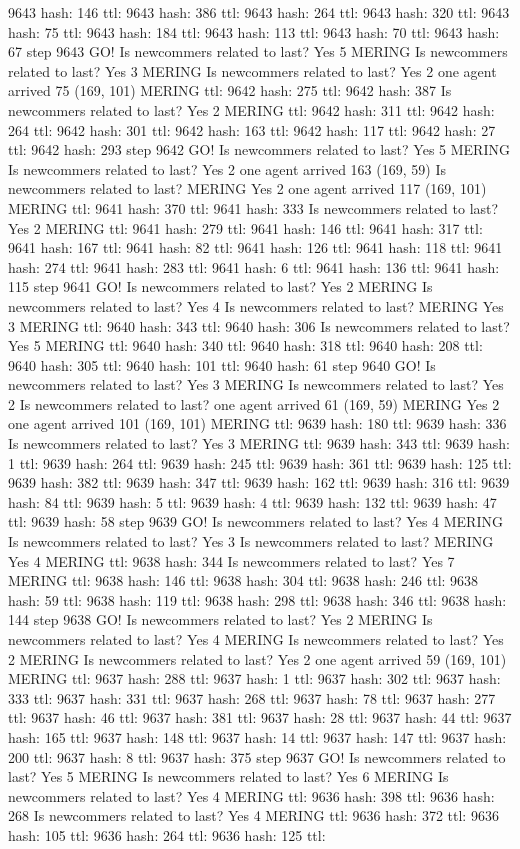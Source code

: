 9643 hash: 146 ttl: 9643 hash: 386 ttl: 9643 hash: 264 ttl: 9643 hash: 320 ttl: 9643 hash: 75 ttl: 9643 hash: 184 ttl: 9643 hash: 113 ttl: 9643 hash: 70 ttl: 9643 hash: 67 step 9643 GO! Is newcommers related to last? Yes 5 MERING Is newcommers related to last? Yes 3 MERING Is newcommers related to last? Yes 2 one agent arrived 75 (169, 101) MERING ttl: 9642 hash: 275 ttl: 9642 hash: 387 Is newcommers related to last? Yes 2 MERING ttl: 9642 hash: 311 ttl: 9642 hash: 264 ttl: 9642 hash: 301 ttl: 9642 hash: 163 ttl: 9642 hash: 117 ttl: 9642 hash: 27 ttl: 9642 hash: 293 step 9642 GO! Is newcommers related to last? Yes 5 MERING Is newcommers related to last? Yes 2 one agent arrived 163 (169, 59) Is newcommers related to last? MERING Yes 2 one agent arrived 117 (169, 101) MERING ttl: 9641 hash: 370 ttl: 9641 hash: 333 Is newcommers related to last? Yes 2 MERING ttl: 9641 hash: 279 ttl: 9641 hash: 146 ttl: 9641 hash: 317 ttl: 9641 hash: 167 ttl: 9641 hash: 82 ttl: 9641 hash: 126 ttl: 9641 hash: 118 ttl: 9641 hash: 274 ttl: 9641 hash: 283 ttl: 9641 hash: 6 ttl: 9641 hash: 136 ttl: 9641 hash: 115 step 9641 GO! Is newcommers related to last? Yes 2 MERING Is newcommers related to last? Yes 4 Is newcommers related to last? MERING Yes 3 MERING ttl: 9640 hash: 343 ttl: 9640 hash: 306 Is newcommers related to last? Yes 5 MERING ttl: 9640 hash: 340 ttl: 9640 hash: 318 ttl: 9640 hash: 208 ttl: 9640 hash: 305 ttl: 9640 hash: 101 ttl: 9640 hash: 61 step 9640 GO! Is newcommers related to last? Yes 3 MERING Is newcommers related to last? Yes 2 Is newcommers related to last? one agent arrived 61 (169, 59) MERING Yes 2 one agent arrived 101 (169, 101) MERING ttl: 9639 hash: 180 ttl: 9639 hash: 336 Is newcommers related to last? Yes 3 MERING ttl: 9639 hash: 343 ttl: 9639 hash: 1 ttl: 9639 hash: 264 ttl: 9639 hash: 245 ttl: 9639 hash: 361 ttl: 9639 hash: 125 ttl: 9639 hash: 382 ttl: 9639 hash: 347 ttl: 9639 hash: 162 ttl: 9639 hash: 316 ttl: 9639 hash: 84 ttl: 9639 hash: 5 ttl: 9639 hash: 4 ttl: 9639 hash: 132 ttl: 9639 hash: 47 ttl: 9639 hash: 58 step 9639 GO! Is newcommers related to last? Yes 4 MERING Is newcommers related to last? Yes 3 Is newcommers related to last? MERING Yes 4 MERING ttl: 9638 hash: 344 Is newcommers related to last? Yes 7 MERING ttl: 9638 hash: 146 ttl: 9638 hash: 304 ttl: 9638 hash: 246 ttl: 9638 hash: 59 ttl: 9638 hash: 119 ttl: 9638 hash: 298 ttl: 9638 hash: 346 ttl: 9638 hash: 144 step 9638 GO! Is newcommers related to last? Yes 2 MERING Is newcommers related to last? Yes 4 MERING Is newcommers related to last? Yes 2 MERING Is newcommers related to last? Yes 2 one agent arrived 59 (169, 101) MERING ttl: 9637 hash: 288 ttl: 9637 hash: 1 ttl: 9637 hash: 302 ttl: 9637 hash: 333 ttl: 9637 hash: 331 ttl: 9637 hash: 268 ttl: 9637 hash: 78 ttl: 9637 hash: 277 ttl: 9637 hash: 46 ttl: 9637 hash: 381 ttl: 9637 hash: 28 ttl: 9637 hash: 44 ttl: 9637 hash: 165 ttl: 9637 hash: 148 ttl: 9637 hash: 14 ttl: 9637 hash: 147 ttl: 9637 hash: 200 ttl: 9637 hash: 8 ttl: 9637 hash: 375 step 9637 GO! Is newcommers related to last? Yes 5 MERING Is newcommers related to last? Yes 6 MERING Is newcommers related to last? Yes 4 MERING ttl: 9636 hash: 398 ttl: 9636 hash: 268 Is newcommers related to last? Yes 4 MERING ttl: 9636 hash: 372 ttl: 9636 hash: 105 ttl: 9636 hash: 264 ttl: 9636 hash: 125 ttl: 